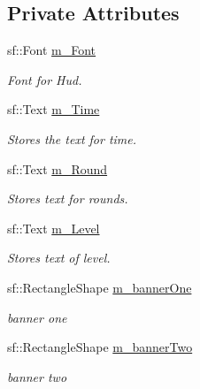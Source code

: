 \subsection*{Private Attributes}
\begin{DoxyCompactItemize}
\item 
\mbox{\label{class_h_u_d_a1ac7967045011fe752db3fd8de62b68d}} 
sf\+::\+Font \mbox{\hyperlink{class_h_u_d_a1ac7967045011fe752db3fd8de62b68d}{m\+\_\+\+Font}}
\begin{DoxyCompactList}\small\item\em Font for Hud. \end{DoxyCompactList}\item 
\mbox{\label{class_h_u_d_a9d54bc20291aad800f8cce795a0e05a5}} 
sf\+::\+Text \mbox{\hyperlink{class_h_u_d_a9d54bc20291aad800f8cce795a0e05a5}{m\+\_\+\+Time}}
\begin{DoxyCompactList}\small\item\em Stores the text for time. \end{DoxyCompactList}\item 
\mbox{\label{class_h_u_d_ab24658e967fc0726d6c4e49133c15586}} 
sf\+::\+Text \mbox{\hyperlink{class_h_u_d_ab24658e967fc0726d6c4e49133c15586}{m\+\_\+\+Round}}
\begin{DoxyCompactList}\small\item\em Stores text for rounds. \end{DoxyCompactList}\item 
\mbox{\label{class_h_u_d_ab35f5d57a641f853fd9a49387e5b98f9}} 
sf\+::\+Text \mbox{\hyperlink{class_h_u_d_ab35f5d57a641f853fd9a49387e5b98f9}{m\+\_\+\+Level}}
\begin{DoxyCompactList}\small\item\em Stores text of level. \end{DoxyCompactList}\item 
\mbox{\label{class_h_u_d_a4f213ecef435d021d79e6c7faec93fb2}} 
sf\+::\+Rectangle\+Shape \mbox{\hyperlink{class_h_u_d_a4f213ecef435d021d79e6c7faec93fb2}{m\+\_\+banner\+One}}
\begin{DoxyCompactList}\small\item\em banner one \end{DoxyCompactList}\item 
\mbox{\label{class_h_u_d_af9fa06aa1db9a1e42b269ddbffcf220e}} 
sf\+::\+Rectangle\+Shape \mbox{\hyperlink{class_h_u_d_af9fa06aa1db9a1e42b269ddbffcf220e}{m\+\_\+banner\+Two}}
\begin{DoxyCompactList}\small\item\em banner two \end{DoxyCompactList}\end{DoxyCompactItemize}


